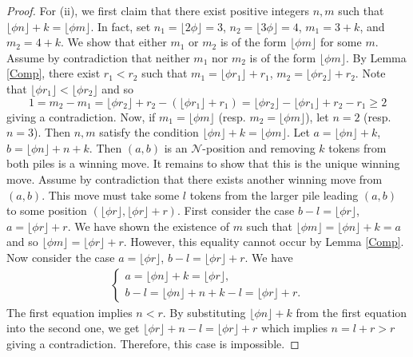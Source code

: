 \documentclass[12pt]{amsart}
\theoremstyle{plain}
\theoremstyle{definition}
\theoremstyle{remark}
\begin{document}
\begin{proof}
For (ii), we first claim that there exist positive integers $n,m$ such that $\lfloor\phi n\rfloor + k = \lfloor\phi m\rfloor$. In fact, set $n_1 = \lfloor 2\phi\rfloor = 3$, $n_2 = \lfloor3\phi \rfloor = 4$, $m_1 = 3+k$, and $m_2 = 4 + k$. We show that either $m_1$ or $m_2$ is of the form $\lfloor\phi m\rfloor$ for some $m$. Assume by contradiction that neither $m_1$ nor $m_2$ is of the form $\lfloor\phi m\rfloor$. By Lemma \ref{Comp}, there exist $r_1 < r_2$ such that $m_1 = \lfloor\phi r_1\rfloor +r_1$, $m_2 = \lfloor\phi r_2\rfloor +r_2$. Note that $\lfloor\phi r_1\rfloor < \lfloor\phi r_2\rfloor$ and so
\[1 = m_2 - m_1  = \lfloor\phi r_2\rfloor +r_2 - (\lfloor\phi r_1\rfloor +r_1)
                 = \lfloor\phi r_2\rfloor - \lfloor\phi r_1\rfloor + r_2 - r_1 \geq 2 \]
giving a contradiction. Now, if $m_1 = \lfloor\phi m\rfloor$ (resp. $m_2 = \lfloor\phi m\rfloor$), let $n = 2$ (resp. $n = 3$). Then $n, m$ satisfy the condition $\lfloor\phi n\rfloor + k = \lfloor\phi m\rfloor$. Let $a = \lfloor\phi n\rfloor + k$, $b = \lfloor\phi n\rfloor +n + k$. Then $(a,b)$ is an ${\mathcal{N}}$-position and removing $k$ tokens from both piles is a winning move. It remains to show that this is the unique winning move. Assume by contradiction that there exists another winning move from $(a,b)$. This move must take some $l$ tokens from the larger pile leading $(a,b)$ to some position $(\lfloor\phi r\rfloor, \lfloor\phi r\rfloor + r)$. First consider the case $b-l = \lfloor\phi r\rfloor$, $a = \lfloor\phi r\rfloor + r$. We have shown the existence of $m$ such that $\lfloor\phi m\rfloor = \lfloor\phi n\rfloor + k = a$ and so $\lfloor\phi m\rfloor = \lfloor\phi r\rfloor + r$. However, this equality cannot occur by Lemma \ref{Comp}. Now consider the case $a = \lfloor\phi r\rfloor$, $b-l = \lfloor\phi r\rfloor + r$. We have
\begin{align*}
\begin{cases}
a = \lfloor\phi n\rfloor + k = \lfloor\phi r\rfloor,\\
b-l = \lfloor\phi n\rfloor + n + k - l = \lfloor\phi r\rfloor +r.
\end{cases}
\end{align*}
The first equation implies $n < r$. By substituting $\lfloor\phi n\rfloor + k$ from the first equation into the second one, we get $\lfloor\phi r\rfloor + n - l = \lfloor\phi r\rfloor + r$ which implies $n = l+r > r$ giving a contradiction. Therefore, this case is impossible.
\end{proof}
\end{document}
